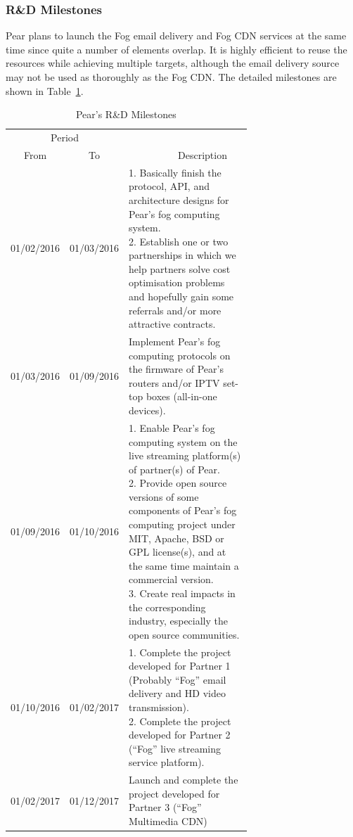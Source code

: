 \subsubsection{R\&D Milestones}
Pear plans to launch the Fog email delivery and Fog CDN services at the same time since quite a number of elements overlap. It is highly efficient to reuse the resources while achieving multiple targets, although the email delivery source may not be used as thoroughly as the Fog CDN. The detailed milestones are shown in Table~\ref{tb:rd_milestone}. 
\begin{table}
	\centering
	\caption{Pear's R\&D Milestones}\label{tb:rd_milestone}
	\small
	\begin{tabular}[t]{ccp{0.68\linewidth}}  
		\toprule
		\multicolumn{2}{c}{Period} \\
		\cmidrule(r){1-2}
		From & To & {\textsc{~~~~~~~~~~}Description}\\
		\midrule
		01/02/2016 & 01/03/2016  & {1. Basically finish the protocol, API, and architecture designs for Pear's fog computing system.\newline 2. Establish one or two partnerships in which we help partners solve cost optimisation problems and hopefully gain some referrals and/or more attractive contracts.}\\
		01/03/2016 & 01/09/2016    & {Implement Pear's fog computing protocols on the firmware of Pear's routers and/or IPTV set-top boxes (all-in-one devices).}\\
		01/09/2016 & 01/10/2016 & {1. Enable Pear's fog computing system on the live streaming platform(s) of partner(s) of Pear.\newline 2. Provide open source versions of some components of Pear's fog computing project under MIT, Apache, BSD or GPL license(s), and at the same time maintain a commercial version.\newline 3. Create real impacts in the corresponding industry, especially the open source communities.}\\
		01/10/2016 & 01/02/2017 & {1. Complete the project developed for Partner 1 (Probably ``Fog'' email delivery and HD video transmission).\newline 2. Complete the project developed for Partner 2 (``Fog'' live streaming service platform).}\\
		01/02/2017 & 01/12/2017    & {Launch and complete the project developed for Partner 3 (“Fog” Multimedia CDN)}\\
		\bottomrule
	\end{tabular}
\end{table}

